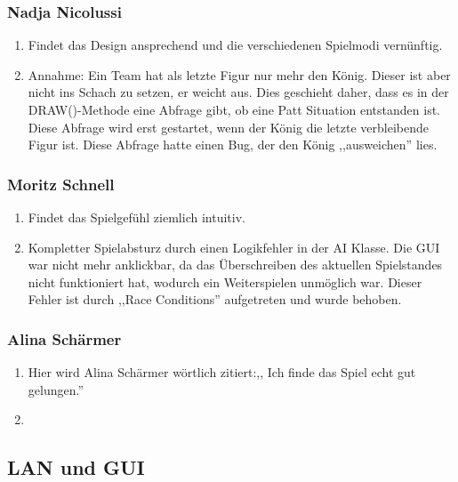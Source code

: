 \documentclass[12pt,a4paper]{article}
\begin{document}
{\subsubsection*{Nadja Nicolussi}
\begin{enumerate}[I]
	\item{Findet das Design ansprechend und die verschiedenen Spielmodi vernünftig.}
	\item{Annahme: Ein Team hat als letzte Figur nur mehr den König. Dieser ist aber nicht ins Schach zu setzen, er weicht aus. Dies geschieht daher, dass es in der DRAW()-Methode eine Abfrage gibt, ob eine Patt Situation entstanden ist. Diese Abfrage wird erst gestartet, wenn der König die letzte verbleibende Figur ist. Diese Abfrage hatte einen Bug, der den König ,,ausweichen'' lies.}
\end{enumerate}

\subsubsection*{Moritz Schnell}
\begin{enumerate}[I]
	\item{Findet das Spielgefühl ziemlich intuitiv.}
	\item{Kompletter Spielabsturz durch einen Logikfehler in der AI Klasse. Die GUI war nicht mehr anklickbar, da das Überschreiben des aktuellen Spielstandes nicht funktioniert hat, wodurch ein Weiterspielen unmöglich war. Dieser Fehler ist durch ,,Race Conditions'' aufgetreten und wurde behoben.}
\end{enumerate}

\subsubsection*{Alina Schärmer}
\begin{enumerate}[I]
	\item{Hier wird Alina Schärmer wörtlich zitiert:,, Ich finde das Spiel echt gut gelungen.''}
	\item{}
\end{enumerate}

\subsection{LAN und GUI}
\label{SUBSEC:BETALAN}


\clearpage\vfill\newpage{}
}
\end{document}
